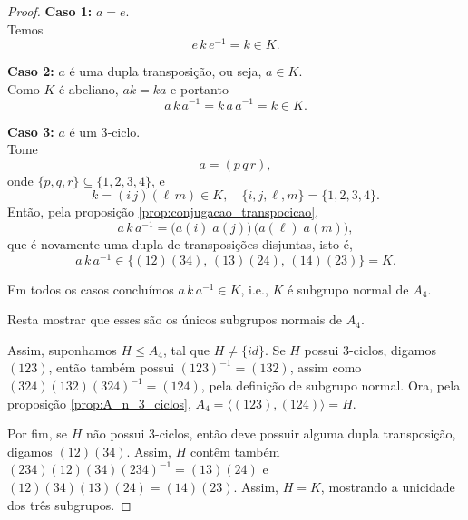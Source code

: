 \documentclass[11pt,openany]{book}
\newcommand{\gen}[1]{\ensuremath{\langle #1\rangle}}
\newenvironment{novo}{
    \color{red}
}{}
\begin{document}
\begin{novo}
\begin{proof}
    \medskip
    \textbf{Caso 1:} \(a = e\).\\
    Temos
    \[
    e\,k\,e^{-1} = k \in K.
    \]

    \medskip
    \textbf{Caso 2:} \(a\) é uma dupla transposição, ou seja, \(a\in K\).\\
    Como \(K\) é abeliano, \(a k = k a\) e portanto
    \[
    a\,k\,a^{-1} = k\,a\,a^{-1} = k \in K.
    \]

    \medskip
    \textbf{Caso 3:} \(a\) é um 3‑ciclo.\\
    Tome
    \[
    a = (p\,q\,r),
    \]
    onde \(\{p,q,r\}\subseteq\{1,2,3,4\}\), e
    \[
    k = (i\,j)(\ell\,m)\in K,
    \quad
    \{i,j,\ell,m\}=\{1,2,3,4\}.
    \]
    Então, pela proposição \ref{prop:conjugacao_transpocicao},
    \[
    a\,k\,a^{-1}
    = \bigl(a(i)\;a(j)\bigr)\,\bigl(a(\ell)\;a(m)\bigr),
    \]
    que é novamente uma dupla de transposições disjuntas, isto é,
    \[
    a\,k\,a^{-1}\in\{(12)(34),\,(13)(24),\,(14)(23)\} = K.
    \]

    \smallskip
    Em todos os casos concluímos \(a\,k\,a^{-1}\in K\), i.e., $K$ é subgrupo normal de $A_4$.

    Resta mostrar que esses são os únicos subgrupos normais de $A_4$.

    Assim, suponhamos $H \leq A_4$, tal que $H \not= \{id\}$. Se $H$ possui 3-ciclos, digamos $(123)$, então também possui $(123)^{-1} = (132)$, assim como $(324)(132)(324)^{-1} = (124)$, pela definição de subgrupo normal.
    Ora, pela proposição \ref{prop:A_n_3_ciclos}, $A_4 = \gen{(123),(124)} = H$.

    Por fim, se $H$ não possui 3-ciclos, então deve possuir alguma dupla transposição, digamos $(12)(34)$. Assim, $H$ contêm também $(234)(12)(34)(234)^{-1} = (13)(24)$ e $(12)(34)(13)(24) = (14)(23)$. Assim, $H = K$, mostrando a unicidade dos três subgrupos.
\end{proof}
\end{novo}
\end{document}
